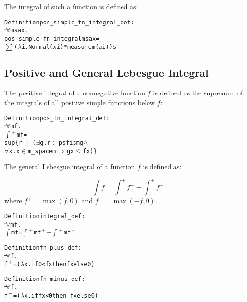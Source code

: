 The integral of such a function is defined as:
\begin{hol}
\begin{alltt}
Definition pos\_simple\_fn\_integral\_def :
\(\!\!\!{\turn}\!\!\!\!\) \(\forall\)m s a x.
pos\_simple\_fn\_integral m s a x =
\(\sum\) (\(\lambda\)i. Normal (x i) * measure m (a i)) s
\end{alltt}
\end{hol}

\subsection{Positive and General Lebesgue Integral}

The positive integral of a nonnegative function $f$ is defined as the supremum of the integrals of all positive simple functions below $f$:
\begin{hol}
\begin{alltt}
Definition pos\_fn\_integral\_def :
\(\!\!\!{\turn}\!\!\!\!\) \(\forall\)m f.
\(\int\)\(\sp{+}\) m f =
sup \{r \,|\, (\(\exists\)g. r \(\in\) psfis m g \(\land\)
                \(\forall\)x. x \(\in\) m\_space m \(\Rightarrow\) g x \(\le\) f x)\}
\end{alltt}
\end{hol}

The general Lebesgue integral of a function $f$ is defined as:

\[
\int f = \int^+ f^+ - \int^+ f^-
\]
where $f^+ = \max(f, 0)$ and $f^- = \max(-f, 0)$.

\begin{hol}
\begin{alltt}
Definition integral\_def :
\(\!\!\!{\turn}\!\!\!\!\) \(\forall\)m f.
\(\int\) m f = \(\int\)\(\sp{+}\) m f\(\sp{+}\) \({-}\) \(\int\)\(\sp{+}\) m f\(\sp{-}\)
\end{alltt}
\end{hol}

\begin{hol}
\begin{alltt}
Definition fn\_plus\_def :
\(\!\!\!{\turn}\!\!\!\!\) \(\forall\)f.
f\(\sp{+}\) = (\(\lambda\)x. if 0 < f x then f x else 0)
\end{alltt}
\end{hol}

\begin{hol}
\begin{alltt}
Definition fn\_minus\_def :
\(\!\!\!{\turn}\!\!\!\!\) \(\forall\)f.
f\(\sp{-}\) = (\(\lambda\)x. if f x < 0 then -f x else 0)
\end{alltt}
\end{hol}

